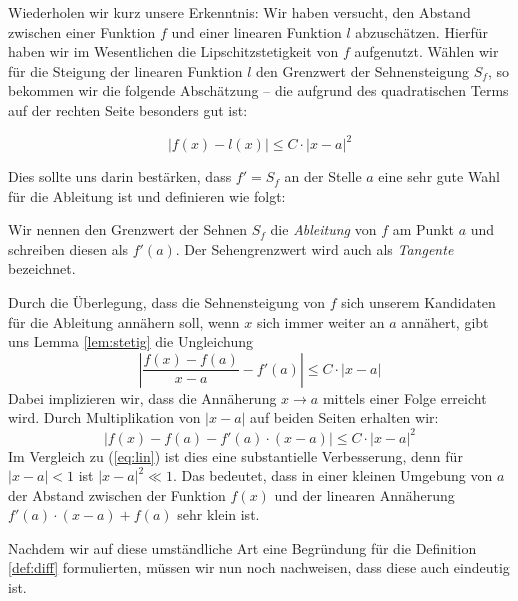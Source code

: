 Wiederholen wir kurz unsere Erkenntnis: Wir haben versucht, den Abstand zwischen einer Funktion $f$ und einer linearen Funktion $l$ abzuschätzen. Hierfür haben wir im Wesentlichen die Lipschitzstetigkeit von $f$ aufgenutzt. Wählen wir für die Steigung der linearen Funktion $l$ den Grenzwert der Sehnensteigung $S_f$, so bekommen wir die folgende Abschätzung -- die aufgrund des quadratischen Terms auf der rechten Seite besonders gut ist:

\begin{equation}
\left| f(x)-l(x) \right| \le C\cdot |x-a|^2
\end{equation}

Dies sollte uns darin bestärken, dass $f'=S_f$ an der Stelle $a$ eine sehr gute Wahl für die Ableitung ist und definieren wie folgt:

\begin{definition}\label{def:diff}
Wir nennen den Grenzwert der Sehnen $S_f$ die \textsl{Ableitung} von $f$ am Punkt $a$ und schreiben diesen als $f'(a)$. Der Sehengrenzwert wird auch als \textsl{Tangente} bezeichnet. 
\end{definition}

\bigskip

Durch die Überlegung, dass die Sehnensteigung von $f$ sich unserem Kandidaten für die Ableitung annähern soll, wenn $x$ sich immer weiter an $a$ annähert, gibt uns Lemma \ref{lem:stetig} die Ungleichung
\[
\left| \frac{f(x)-f(a)}{x-a} - f'(a) \right| \le C \cdot |x-a|
\]
Dabei implizieren wir, dass die Annäherung $x\rightarrow a$ mittels einer Folge erreicht wird. Durch Multiplikation von $|x-a|$ auf beiden Seiten erhalten wir:
\[
|f(x)-f(a) -f'(a)\cdot (x-a)| \le C\cdot |x-a|^2
\]
Im Vergleich zu (\ref{eq:lin}) ist dies eine substantielle Verbesserung, denn für $|x-a|<1$ ist $|x-a|^2\ll 1$. Das bedeutet, dass in einer kleinen Umgebung von $a$ der Abstand zwischen der Funktion $f(x)$ und der linearen Annäherung $f'(a)\cdot (x-a)+f(a)$ sehr klein ist.

Nachdem wir auf diese umständliche Art eine Begründung für die Definition \ref{def:diff} formulierten, müssen wir nun noch nachweisen, dass diese auch eindeutig ist. 

